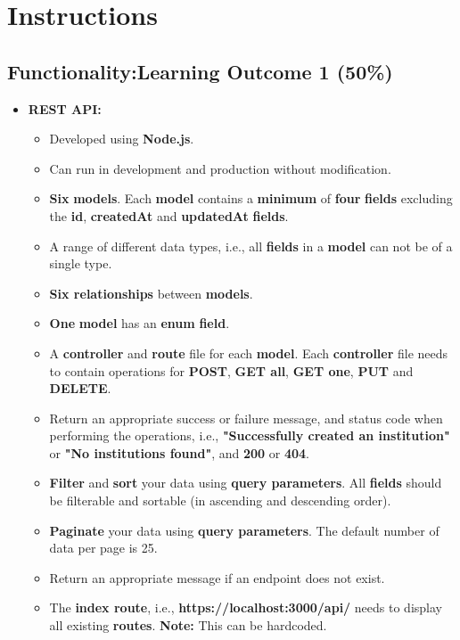 \documentclass{article}
\begin{document}
\newpage

\section*{Instructions}

\subsection*{Functionality:Learning Outcome 1 (50\%)}
\begin{itemize} 
	\item \textbf{REST API:}
	\begin{itemize}
		\item Developed using \textbf{Node.js}.
		\item Can run in development and production without modification.
		\item \textbf{Six} \textbf{models}. Each \textbf{model} contains a \textbf{minimum} of \textbf{four} \textbf{fields} excluding the \textbf{id}, \textbf{createdAt} and \textbf{updatedAt} \textbf{fields}.
		\item A range of different data types, i.e., all \textbf{fields} in a \textbf{model} can not be of a single type.
		\item \textbf{Six relationships} between \textbf{models}.
		\item \textbf{One} \textbf{model} has an \textbf{enum} \textbf{field}. 
		\item A \textbf{controller} and \textbf{route} file for each \textbf{model}. Each \textbf{controller} file needs to contain operations for \textbf{POST}, \textbf{GET all}, \textbf{GET one}, \textbf{PUT} and \textbf{DELETE}.
		\item Return an appropriate success or failure message, and status code when performing the operations, i.e., \textbf{"Successfully created an institution"} or \textbf{"No institutions found"}, and \textbf{200} or \textbf{404}.
		\item \textbf{Filter} and \textbf{sort} your data using \textbf{query parameters}. All \textbf{fields} should be filterable and sortable (in ascending and descending order).
		\item \textbf{Paginate} your data using \textbf{query parameters}. The default number of data per page is 25.
		\item Return an appropriate message if an endpoint does not exist.
		\item The \textbf{index route}, i.e., \textbf{https://localhost:3000/api/} needs to display all existing \textbf{routes}. \textbf{Note:} This can be hardcoded.

\end{itemize}
\end{itemize}
\end{document}
